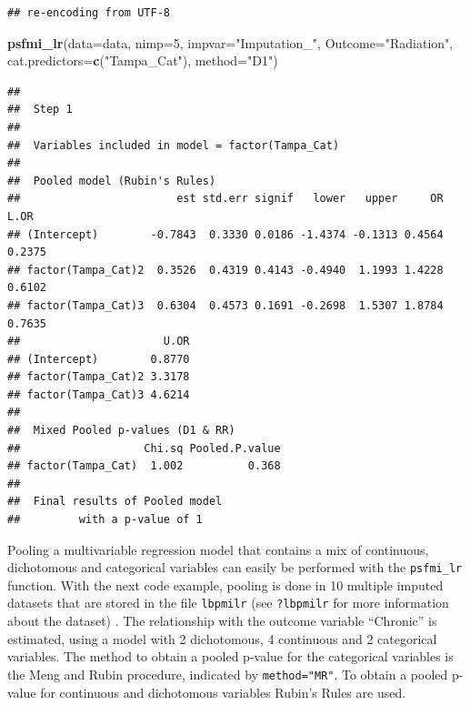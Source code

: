 \documentclass[]{book}
\newenvironment{Shaded}{\begin{snugshade}}{\end{snugshade}}
\newcommand{\KeywordTok}[1]{\textcolor[rgb]{0.13,0.29,0.53}{\textbf{#1}}}
\newcommand{\DataTypeTok}[1]{\textcolor[rgb]{0.13,0.29,0.53}{#1}}
\newcommand{\DecValTok}[1]{\textcolor[rgb]{0.00,0.00,0.81}{#1}}
\newcommand{\StringTok}[1]{\textcolor[rgb]{0.31,0.60,0.02}{#1}}
\newcommand{\NormalTok}[1]{#1}
\begin{document}
\begin{verbatim}
## re-encoding from UTF-8
\end{verbatim}

\begin{Shaded}
\begin{Highlighting}[]
\KeywordTok{psfmi_lr}\NormalTok{(}\DataTypeTok{data=}\NormalTok{data, }\DataTypeTok{nimp=}\DecValTok{5}\NormalTok{, }\DataTypeTok{impvar=}\StringTok{"Imputation_"}\NormalTok{, }\DataTypeTok{Outcome=}\StringTok{"Radiation"}\NormalTok{,}
  \DataTypeTok{cat.predictors=}\KeywordTok{c}\NormalTok{(}\StringTok{"Tampa_Cat"}\NormalTok{), }\DataTypeTok{method=}\StringTok{"D1"}\NormalTok{)}
\end{Highlighting}
\end{Shaded}

\begin{verbatim}
## 
##  Step 1 
## 
##  Variables included in model = factor(Tampa_Cat) 
## 
##  Pooled model (Rubin's Rules) 
##                        est std.err signif   lower   upper     OR   L.OR
## (Intercept)        -0.7843  0.3330 0.0186 -1.4374 -0.1313 0.4564 0.2375
## factor(Tampa_Cat)2  0.3526  0.4319 0.4143 -0.4940  1.1993 1.4228 0.6102
## factor(Tampa_Cat)3  0.6304  0.4573 0.1691 -0.2698  1.5307 1.8784 0.7635
##                      U.OR
## (Intercept)        0.8770
## factor(Tampa_Cat)2 3.3178
## factor(Tampa_Cat)3 4.6214
## 
##  Mixed Pooled p-values (D1 & RR) 
##                   Chi.sq Pooled.P.value
## factor(Tampa_Cat)  1.002          0.368
## 
##  Final results of Pooled model
##         with a p-value of 1
\end{verbatim}

Pooling a multivariable regression model that contains a mix of
continuous, dichotomous and categorical variables can easily be
performed with the \texttt{psfmi\_lr} function. With the next code
example, pooling is done in 10 multiple imputed datasets that are stored
in the file \texttt{lbpmilr} (see \texttt{?lbpmilr} for more information
about the dataset) . The relationship with the outcome variable
``Chronic'' is estimated, using a model with 2 dichotomous, 4 continuous
and 2 categorical variables. The method to obtain a pooled p-value for
the categorical variables is the Meng and Rubin procedure, indicated by
\texttt{method="MR"}. To obtain a pooled p-value for continuous and
dichotomous variables Rubin's Rules are used.
\end{document}
